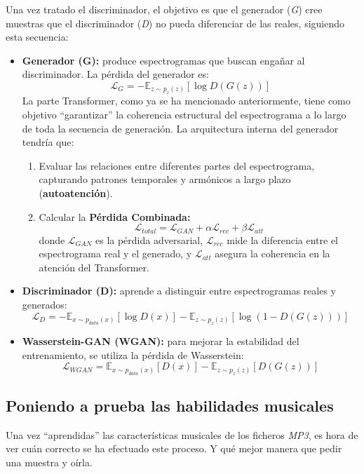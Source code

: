 Una vez tratado el discriminador, el objetivo es que el generador (\textit{G}) cree muestras que el discriminador (\textit{D}) no pueda diferenciar de las reales, siguiendo esta secuencia:

\begin{itemize}
    \item \textbf{Generador (G):} produce espectrogramas que buscan engañar al discriminador. La pérdida del generador es:
    \[
    \mathcal{L}_{G} = -\mathbb{E}_{z \sim p_z(z)}[\log D(G(z))]
    \]
    La parte Transformer, como ya se ha mencionado anteriormente, tiene como objetivo ``garantizar'' la coherencia estructural del espectrograma a lo largo de toda la secuencia de generación. La arquitectura interna del generador tendría que:
    \begin{enumerate}
        \item Evaluar las relaciones entre diferentes partes del espectrograma, capturando patrones temporales y armónicos a largo plazo (\textbf{autoatención}).
        \item  Calcular la \textbf{Pérdida Combinada:}
        \[
        \mathcal{L}_{total} = \mathcal{L}_{GAN} + \alpha \mathcal{L}_{rec} + \beta \mathcal{L}_{att}
        \]
        donde \( \mathcal{L}_{GAN} \) es la pérdida adversarial, \( \mathcal{L}_{rec} \) mide la diferencia entre el espectrograma real y el generado, y \( \mathcal{L}_{att} \) asegura la coherencia en la atención del Transformer.
    \end{enumerate}
    \item \textbf{Discriminador (D):} aprende a distinguir entre espectrogramas reales y generados:
    \[
    \mathcal{L}_{D} = -\mathbb{E}_{x \sim p_{data}(x)}[\log D(x)] - \mathbb{E}_{z \sim p_z(z)}[\log(1 - D(G(z)))]
    \]
    \item \textbf{Wasserstein-GAN (WGAN):} para mejorar la estabilidad del entrenamiento, se utiliza la pérdida de Wasserstein:
    \[
    \mathcal{L}_{WGAN} = \mathbb{E}_{x \sim p_{data}(x)}[D(x)] - \mathbb{E}_{z \sim p_z(z)}[D(G(z))]
    \]
\end{itemize}

\subsection{Poniendo a prueba las habilidades musicales}

Una vez ``aprendidas'' las características musicales de los ficheros \emph{MP3}, es hora de ver cuán correcto se ha efectuado este proceso. Y qué mejor manera que pedir una muestra y oírla.


